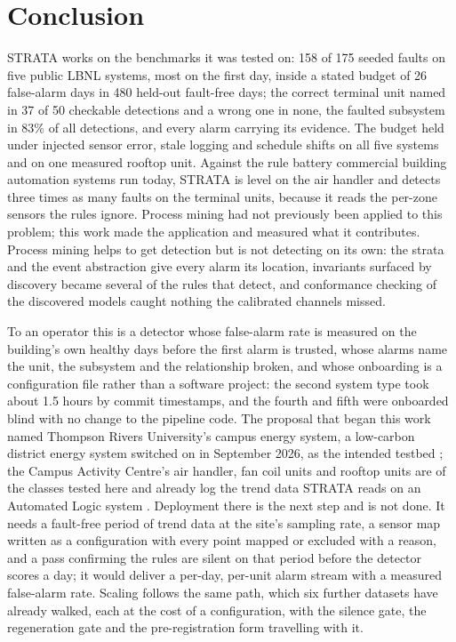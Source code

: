 \documentclass[11pt,letterpaper]{article}
\begin{document}
\section{Conclusion}
\label{sec:conclusion}
STRATA works on the benchmarks it was tested on: 158 of 175 seeded faults on five public LBNL systems, most on the first day, inside a stated budget of 26 false-alarm days in 480 held-out fault-free days; the correct terminal unit named in 37 of 50 checkable detections and a wrong one in none, the faulted subsystem in 83\% of all detections, and every alarm carrying its evidence. The budget held under injected sensor error, stale logging and schedule shifts on all five systems and on one measured rooftop unit. Against the rule battery commercial building automation systems run today, STRATA is level on the air handler and detects three times as many faults on the terminal units, because it reads the per-zone sensors the rules ignore. Process mining had not previously been applied to this problem; this work made the application and measured what it contributes. Process mining helps to get detection but is not detecting on its own: the strata and the event abstraction give every alarm its location, invariants surfaced by discovery became several of the rules that detect, and conformance checking of the discovered models caught nothing the calibrated channels missed.

To an operator this is a detector whose false-alarm rate is measured on the building's own healthy days before the first alarm is trusted, whose alarms name the unit, the subsystem and the relationship broken, and whose onboarding is a configuration file rather than a software project: the second system type took about 1.5 hours by commit timestamps, and the fourth and fifth were onboarded blind with no change to the pipeline code. The proposal that began this work named Thompson Rivers University's campus energy system, a low-carbon district energy system switched on in September 2026, as the intended testbed \cite{tru2026lcdes,tru2025lcdesmilestone}; the Campus Activity Centre's air handler, fan coil units and rooftop units are of the classes tested here and already log the trend data STRATA reads on an Automated Logic system \cite{ses2022cacstudy}. Deployment there is the next step and is not done. It needs a fault-free period of trend data at the site's sampling rate, a sensor map written as a configuration with every point mapped or excluded with a reason, and a pass confirming the rules are silent on that period before the detector scores a day; it would deliver a per-day, per-unit alarm stream with a measured false-alarm rate. Scaling follows the same path, which six further datasets have already walked, each at the cost of a configuration, with the silence gate, the regeneration gate and the pre-registration form travelling with it.
\end{document}
